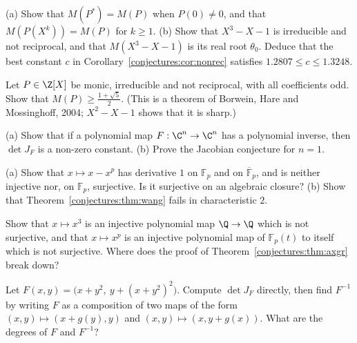 \begin{exercise}[$\star$]\label{conjectures:ex:mahlerbasic}
(a) Show that $M(P^*)=M(P)$ when $P(0)\ne0$, and that $M(P(X^k))=M(P)$ for $k\ge1$. (b) Show that $X^3-X-1$ is irreducible and not reciprocal, and that
$M(X^3-X-1)$ is its real root $\theta_0$. Deduce that the best constant $c$ in Corollary~\ref{conjectures:cor:nonrec} satisfies $1.2807\le c\le1.3248$.
\end{exercise}

\begin{exercise}[$\star\star\star$]\label{conjectures:ex:oddcoef}
Let $P\in\Z[X]$ be monic, irreducible and not reciprocal, with all coefficients odd. Show that $M(P)\ge\frac{1+\sqrt5}2$. (This is a theorem of Borwein,
Hare and Mossinghoff, 2004; $X^2-X-1$ shows that it is sharp.)
\end{exercise}

\begin{exercise}[$\star$]\label{conjectures:ex:jacdim1}
(a) Show that if a polynomial map $F:\C^n\to\C^n$ has a polynomial inverse, then $\det J_F$ is a non-zero constant. (b) Prove the Jacobian conjecture
for $n=1$.
\end{exercise}

\begin{exercise}[$\star\star$]\label{conjectures:ex:charpjac}
(a) Show that $x\mapsto x-x^p$ has derivative $1$ on $\mathbb F_p$ and on $\overline{\mathbb F}_p$, and is neither injective nor, on $\mathbb F_p$, surjective.
Is it surjective on an algebraic closure? (b) Show that Theorem~\ref{conjectures:thm:wang} fails in characteristic $2$.
\end{exercise}

\begin{exercise}[$\star$]\label{conjectures:ex:axfails}
Show that $x\mapsto x^3$ is an injective polynomial map $\Q\to\Q$ which is not surjective, and that $x\mapsto x^p$ is an injective polynomial map of
$\mathbb F_p(t)$ to itself which is not surjective. Where does the proof of Theorem~\ref{conjectures:thm:axgr} break down?
\end{exercise}

\begin{exercise}[$\star\star$]\label{conjectures:ex:triangular}
Let $F(x,y)=\bigl(x+y^2,\ y+(x+y^2)^2\bigr)$. Compute $\det J_F$ directly, then find $F^{-1}$ by writing $F$ as a composition of two maps of the form
$(x,y)\mapsto(x+g(y),y)$ and $(x,y)\mapsto(x,y+g(x))$. What are the degrees of $F$ and $F^{-1}$?
\end{exercise}

